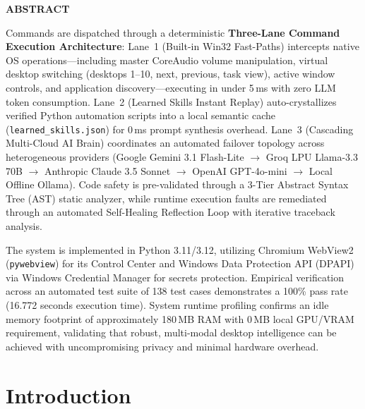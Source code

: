 \documentclass[12pt,letterpaper,oneside]{report}
\newcommand{\frontheading}[1]{%
  \begin{center}\bfseries\fontsize{15}{19}\selectfont #1\end{center}
  \vspace{1cm}
}
\begin{document}
\clearpage
\frontheading{ABSTRACT}
\noindent Commands are dispatched through a deterministic \textbf{Three-Lane Command Execution Architecture}: Lane~1 (Built-in Win32 Fast-Paths) intercepts native OS operations—including master CoreAudio volume manipulation, virtual desktop switching (desktops 1–10, next, previous, task view), active window controls, and application discovery—executing in under 5\,ms with zero LLM token consumption. Lane~2 (Learned Skills Instant Replay) auto-crystallizes verified Python automation scripts into a local semantic cache (\texttt{learned\_skills.json}) for 0\,ms prompt synthesis overhead. Lane~3 (Cascading Multi-Cloud AI Brain) coordinates an automated failover topology across heterogeneous providers (Google Gemini 3.1 Flash-Lite $\to$ Groq LPU Llama-3.3 70B $\to$ Anthropic Claude 3.5 Sonnet $\to$ OpenAI GPT-4o-mini $\to$ Local Offline Ollama). Code safety is pre-validated through a 3-Tier Abstract Syntax Tree (AST) static analyzer, while runtime execution faults are remediated through an automated Self-Healing Reflection Loop with iterative traceback analysis.

\par\medskip
\noindent The system is implemented in Python 3.11/3.12, utilizing Chromium WebView2 (\texttt{pywebview}) for its Control Center and Windows Data Protection API (DPAPI) via Windows Credential Manager for secrets protection. Empirical verification across an automated test suite of 138 test cases demonstrates a 100\% pass rate (16.772 seconds execution time). System runtime profiling confirms an idle memory footprint of approximately 180\,MB RAM with 0\,MB local GPU/VRAM requirement, validating that robust, multi-modal desktop intelligence can be achieved with uncompromising privacy and minimal hardware overhead.

\clearpage
\tableofcontents
\clearpage
\listoffigures
\clearpage
\listoftables

\clearpage
{}
\hypersetup{pageanchor=true}

\chapter{Introduction}
\end{document}
